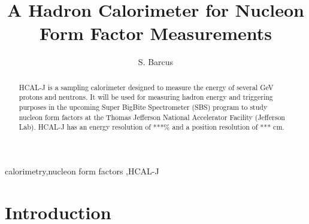 \documentclass[review]{elsarticle}
\newcommand{\hcal}{HCAL-J }
\begin{document}
\begin{frontmatter}

\title{A Hadron Calorimeter for Nucleon Form Factor Measurements}

\author[jlab]{S. Barcus}


\address[jlab]{Jefferson Laboratory}



\begin{abstract}
\hcal is a sampling calorimeter designed to measure the energy of several GeV protons and neutrons. It will be used for measuring hadron energy and triggering purposes in the upcoming Super BigBite Spectrometer (SBS) program to study nucleon form factors at the Thomas Jefferson National Accelerator Facility (Jefferson Lab). \hcal has an energy resolution of ***\% and a position resolution of *** cm. 
\end{abstract}

\begin{keyword}
calorimetry\sep nucleon form factors \sep \hcal
\end{keyword}

\end{frontmatter}

\linenumbers

\section{Introduction}
\end{document}
